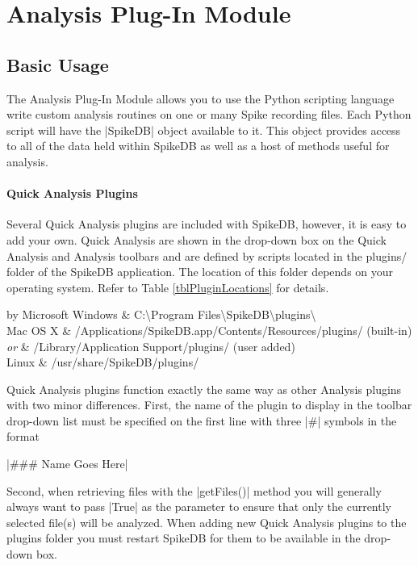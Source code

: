 \documentclass{report}
\begin{document}
\chapter{Analysis Plug-In Module}

\section{Basic Usage}
The Analysis Plug-In Module allows you to use the Python scripting language write custom analysis routines on one or many Spike recording files. Each Python script will have the |SpikeDB| object available to it.  This object provides access to all of the data held within SpikeDB as well as a host of methods useful for analysis.

\subsubsection{Quick Analysis Plugins}
Several Quick Analysis plugins are included with SpikeDB, however, it is easy to add your own. Quick Analysis are shown in the drop-down box on the Quick Analysis and Analysis toolbars and are defined by scripts located in the plugins/ folder of the SpikeDB application. The location of this folder depends on your operating system. Refer to Table \ref{tblPluginLocations} for details.
\begin{table}[h]
	\begin{center}
	\caption{Default plugins folder locations on different operating systems.}
	\begin{tabular}{by}
		Microsoft Windows & C:\textbackslash Program Files\textbackslash SpikeDB\textbackslash plugins\textbackslash \\
		\hline
		Mac OS X & /Applications/SpikeDB.app/Contents/Resources/plugins/ (built-in) \\
		\emph{or} & /Library/Application Support/plugins/ (user added)\\
		\hline
		Linux & /usr/share/SpikeDB/plugins/ \\
	\end{tabular}
	\label{tblPluginLocations}
	\end{center}
\end{table}
Quick Analysis plugins function exactly the same way as other Analysis plugins with two minor differences. First, the name of the plugin to display in the toolbar drop-down list must be specified on the first line with three |#| symbols in the format 
\begin{center}|### Name Goes Here|\end{center}
Second, when retrieving files with the |getFiles()| method you will generally always want to pass |True| as the parameter to ensure that only the currently selected file(s) will be analyzed. When adding new Quick Analysis plugins to the plugins folder you must restart SpikeDB for them to be available in the drop-down box.
\end{document}
